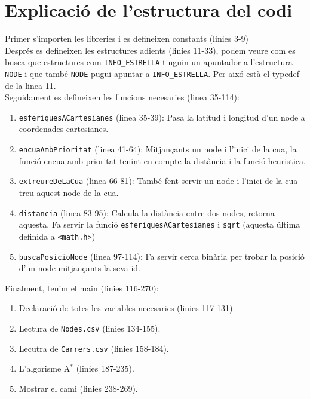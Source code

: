 \documentclass[a4paper, 12pt]{article}
\begin{document}
    \section{Explicació de l'estructura del codi}
    Primer s'importen les libreries i es defineixen constants (linies 3-9)\\
    Després es defineixen les estructures adients (linies 11-33), podem veure com es busca que
    estructures com \verb|INFO_ESTRELLA| tinguin un apuntador a l'estructura \verb|NODE| i que també
    \verb|NODE| pugui apuntar a \verb|INFO_ESTRELLA|. Per aixó està el typedef de la linea 11.\\
    Seguidament es defineixen les funcions necesaries (linea 35-114):
    \begin{enumerate}
        \item \verb|esferiquesACartesianes| (linea 35-39): Pasa la latitud i longitud d'un node a
        coordenades cartesianes.
        \item \verb|encuaAmbPrioritat| (linea 41-64): Mitjançants un node i l'inici de la cua, la
        funció encua amb prioritat tenint en compte la distància i la funció heuristica. 
        \item \verb|extreureDeLaCua| (linea 66-81): També fent servir un node i l'inici de la cua
        treu aquest node de la cua.
        \item \verb|distancia| (linea 83-95): Calcula la distància entre dos nodes, retorna aquesta.
        Fa servir la funció \verb|esferiquesACartesianes| i \verb|sqrt| (aquesta última definida a
        \verb|<math.h>|)
        \item \verb|buscaPosicioNode| (linea 97-114): Fa servir cerca binària per trobar la posició
        d'un node mitjançants la seva id.
    \end{enumerate}
    Finalment, tenim el main (linies 116-270):
    \begin{enumerate}
        \item Declaració de totes les variables necesaries (linies 117-131).
        \item Lectura de \verb|Nodes.csv| (linies 134-155).
        \item Lecutra de \verb|Carrers.csv| (linies 158-184).
        \item L'algorisme A$^*$ (linies 187-235).
        \item Mostrar el cami (linies 238-269).
    \end{enumerate}
\end{document}
